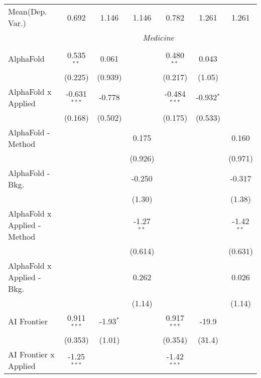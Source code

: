 \begin{tabular}{lcccccc}
Mean(Dep. Var.) & 0.692 & 1.146 & 1.146 & 0.782 & 1.261 & 1.261 \\
 & \multicolumn{6}{c}{\textit{Medicine}} \\ \\
   AlphaFold                      & 0.535$^{**}$   & 0.061         &               & 0.480$^{**}$   & 0.043         &   \\   
                                  & (0.225)        & (0.939)       &               & (0.217)        & (1.05)        &   \\   
   AlphaFold x Applied            & -0.631$^{***}$ & -0.778        &               & -0.484$^{***}$ & -0.932$^{*}$  &   \\   
                                  & (0.168)        & (0.502)       &               & (0.175)        & (0.533)       &   \\   
   AlphaFold - Method             &                &               & 0.175         &                &               & 0.160\\   
                                  &                &               & (0.926)       &                &               & (0.971)\\   
   AlphaFold - Bkg.               &                &               & -0.250        &                &               & -0.317\\   
                                  &                &               & (1.30)        &                &               & (1.38)\\   
   AlphaFold x Applied - Method   &                &               & -1.27$^{**}$  &                &               & -1.42$^{**}$\\   
                                  &                &               & (0.614)       &                &               & (0.631)\\   
   AlphaFold x Applied - Bkg.     &                &               & 0.262         &                &               & 0.026\\   
                                  &                &               & (1.14)        &                &               & (1.14)\\   
   AI Frontier                    & 0.911$^{***}$  & -1.93$^{*}$   &               & 0.917$^{***}$  & -19.9         &   \\   
                                  & (0.353)        & (1.01)        &               & (0.354)        & (31.4)        &   \\   
   AI Frontier x Applied          & -1.25$^{***}$  &               &               & -1.42$^{***}$  &               &   \\   

\end{tabular}
